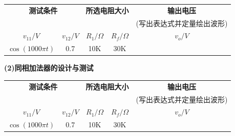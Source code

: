 \documentclass[10pt, a4paper]{article} %
\begin{document}
\begin{tabular}{|c|c|c|c|c|}
    \hline
    \multicolumn{2}{|c|}{\textbf{测试条件}} & \multicolumn{2}{c|}{\textbf{所选电阻大小}} & \textbf{输出电压} \\
    \multicolumn{2}{|c|}{} &  \multicolumn{2}{|c|}{}  &(写出表达式并定量绘出波形) \\ \hline
    $v_{11}/V$ & $v_{12}/V$ & $R_1/\Omega$ & $R_f/\Omega$ & $v_o/V$ \\ \hline
    $\cos(1000\pi t)$ & 0.7 &10K&30K& \\ \hline
\end{tabular}
\clearpage

\textbf{(2)同相加法器的设计与测试}

\begin{tabular}{|c|c|c|c|c|}
    \hline
    \multicolumn{2}{|c|}{\textbf{测试条件}} & \multicolumn{2}{c|}{\textbf{所选电阻大小}} & \textbf{输出电压} \\
    
     \multicolumn{2}{|c|}{} &  \multicolumn{2}{|c|}{}  & (写出表达式并定量绘出波形) \\
    \hline
    $v_{11}/V$ & $v_{12}/V$ & $R_1/\Omega$& $R_f/\Omega$& $v_o/V$ \\
    \hline
    $\cos(1000\pi t)$ & 0.7 &10K&30K& \\
    \hline
\end{tabular}
\end{document}

